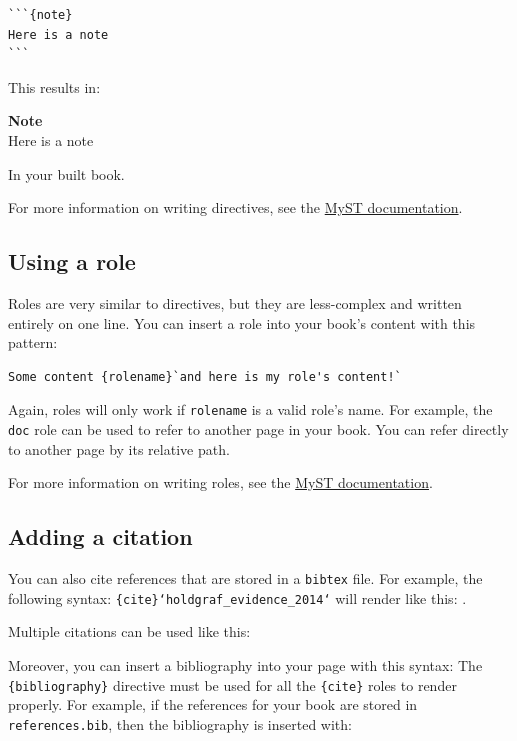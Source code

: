 \documentclass{article}
\begin{document}
\begin{verbatim}
```{note}
Here is a note
```
\end{verbatim}

This results in:

\begin{framed}
\textbf{Note}\\
Here is a note
\end{framed}

In your built book.

For more information on writing directives, see the
\href{https://myst-parser.readthedocs.io/}{MyST documentation}.

\subsection{Using a role}

Roles are very similar to directives, but they are less-complex and written
entirely on one line. You can insert a role into your book's content with
this pattern:

\begin{verbatim}
Some content {rolename}`and here is my role's content!`
\end{verbatim}

Again, roles will only work if \texttt{rolename} is a valid role's name. For example,
the \texttt{doc} role can be used to refer to another page in your book. You can
refer directly to another page by its relative path.

For more information on writing roles, see the
\href{https://myst-parser.readthedocs.io/}{MyST documentation}.

\subsection{Adding a citation}

You can also cite references that are stored in a \texttt{bibtex} file. For example,
the following syntax: \texttt{\{cite\}`holdgraf\_evidence\_2014`} will render like
this: \cite{holdgraf_evidence_2014}.

Multiple citations can be used like this:
\citet{holdgraf_rapid_2016, holdgraf_encoding_2017}

Moreover, you can insert a bibliography into your page with this syntax:
The \texttt{\{bibliography\}} directive must be used for all the \texttt{\{cite\}} roles to
render properly.
For example, if the references for your book are stored in \texttt{references.bib},
then the bibliography is inserted with:
\end{document}
